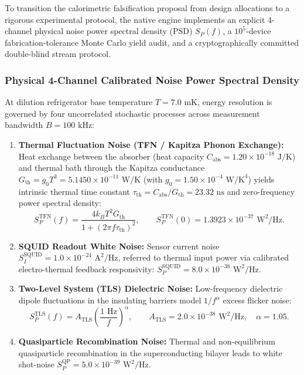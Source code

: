 \documentclass[11pt,letterpaper]{article}
\theoremstyle{plain}
\begin{document}
To transition the calorimetric falsification proposal from design allocations to a rigorous experimental protocol, the native engine implements an explicit 4-channel physical noise power spectral density (PSD) $S_P(f)$, a $10^5$-device fabrication-tolerance Monte Carlo yield audit, and a cryptographically committed double-blind stream protocol.

\subsubsection{Physical 4-Channel Calibrated Noise Power Spectral Density}
At dilution refrigerator base temperature $T = 7.0\text{ mK}$, energy resolution is governed by four uncorrelated stochastic processes across measurement bandwidth $B = 100\text{ kHz}$:
\begin{enumerate}
\item[(i)] \textbf{Thermal Fluctuation Noise (TFN / Kapitza Phonon Exchange):} Heat exchange between the absorber (heat capacity $C_{\text{abs}} = 1.20 \times 10^{-18}\text{ J/K}$) and thermal bath through the Kapitza conductance $G_{\text{th}} = g_0 T^3 = 5.1450 \times 10^{-11}\text{ W/K}$ (with $g_0 = 1.50 \times 10^{-4}\text{ W/K}^4$) yields intrinsic thermal time constant $\tau_{\text{th}} = C_{\text{abs}} / G_{\text{th}} = 23.32\text{ ns}$ and zero-frequency power spectral density:
\begin{equation}
S_P^{\text{TFN}}(f) = \frac{4 k_B T^2 G_{\text{th}}}{1 + (2\pi f \tau_{\text{th}})^2}, \qquad S_P^{\text{TFN}}(0) = 1.3923 \times 10^{-37}\text{ W}^2/\text{Hz}.
\end{equation}
\item[(ii)] \textbf{SQUID Readout White Noise:} Sensor current noise $S_I^{\text{SQUID}} = 1.0 \times 10^{-24}\text{ A}^2/\text{Hz}$, referred to thermal input power via calibrated electro-thermal feedback responsivity: $S_P^{\text{SQUID}} = 8.0 \times 10^{-38}\text{ W}^2/\text{Hz}$.
\item[(iii)] \textbf{Two-Level System (TLS) Dielectric Noise:} Low-frequency dielectric dipole fluctuations in the insulating barriers model $1/f^\alpha$ excess flicker noise:
\begin{equation}
S_P^{\text{TLS}}(f) = A_{\text{TLS}} \left(\frac{1\text{ Hz}}{f}\right)^\alpha, \qquad A_{\text{TLS}} = 2.0 \times 10^{-38}\text{ W}^2/\text{Hz}, \quad \alpha = 1.05.
\end{equation}
\item[(iv)] \textbf{Quasiparticle Recombination Noise:} Thermal and non-equilibrium quasiparticle recombination in the superconducting bilayer leads to white shot-noise $S_P^{\text{QP}} = 5.0 \times 10^{-39}\text{ W}^2/\text{Hz}$.
\end{enumerate}
\end{document}
